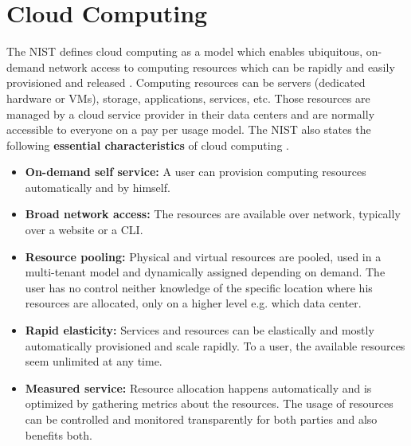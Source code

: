 \section{Cloud Computing}
The \gls{NIST} defines cloud computing as a model which enables ubiquitous, on-demand network access to computing resources which can be rapidly and easily provisioned and released \cite{Mell:2011:SND:2206223}. Computing resources can be servers (dedicated hardware or \gls{VM}s), storage, applications, services, etc. Those resources are managed by a cloud service provider in their data centers and are normally accessible to everyone on a pay per usage model. The \gls{NIST} also states the following \textbf{essential characteristics} of cloud computing \cite{Mell:2011:SND:2206223}.
\begin{itemize}
    \item \textbf{On-demand self service:} A user can provision computing resources automatically and by himself.
    \item \textbf{Broad network access:} The resources are available over network, typically over a website or a \gls{CLI}.
    \item \textbf{Resource pooling:} Physical and virtual resources are pooled, used in a multi-tenant model and dynamically assigned depending on demand. The user has no control neither knowledge of the specific location where his resources are allocated, only on a higher level e.g. which data center.
    \item \textbf{Rapid elasticity:} Services and resources can be elastically and mostly automatically provisioned and scale rapidly. To a user, the available resources seem unlimited at any time.
    \item \textbf{Measured service:} Resource allocation happens automatically and is optimized by gathering metrics about the resources. The usage of resources can be controlled and monitored transparently for both parties and also benefits both.
\end{itemize}

